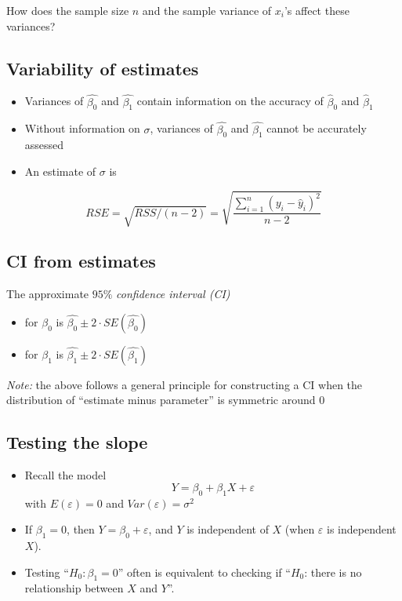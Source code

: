 \documentclass[]{article}
\providecommand{\tightlist}{%
  \setlength{\itemsep}{0pt}\setlength{\parskip}{0pt}}
\begin{document}
How does the sample size \(n\) and the sample variance of \(x_i\)'s
affect these variances?

\subsection{Variability of estimates}\label{variability-of-estimates-1}

\begin{itemize}
\item
  Variances of \(\hat{\beta_0}\) and \(\hat{\beta_1}\) contain
  information on the accuracy of \(\hat{\beta}_0\) and \(\hat{\beta}_1\)
\item
  Without information on \(\sigma\), variances of \(\hat{\beta_0}\) and
  \(\hat{\beta_1}\) cannot be accurately assessed
\item
  An estimate of \(\sigma\) is
\end{itemize}

\[RSE = \sqrt{RSS/(n-2)} = \sqrt{\frac{\sum_{i=1}^n (y_i - \hat{y}_i)^2}{n-2}}\]

\subsection{CI from estimates}\label{ci-from-estimates}

The approximate \(95\%\) \emph{confidence interval (CI)}

\begin{itemize}
\tightlist
\item
  for \(\beta_0\) is \(\hat{\beta_0} \pm 2 \cdot SE(\hat{\beta_0})\)
\item
  for \(\beta_1\) is \(\hat{\beta_1} \pm 2 \cdot SE(\hat{\beta_1})\)
\end{itemize}

\emph{Note:} the above follows a general principle for constructing a CI
when the distribution of ``estimate minus parameter'' is symmetric
around \(0\)

\subsection{Testing the slope}\label{testing-the-slope}

\begin{itemize}
\tightlist
\item
  Recall the model \[Y = \beta_0 + \beta_1 X + \varepsilon\] with
  \(E(\varepsilon)=0\) and \(Var(\varepsilon)=\sigma^2\)
\item
  If \(\beta_1=0\), then \(Y = \beta_0 + \varepsilon\), and \(Y\) is
  independent of \(X\) (when \(\varepsilon\) is independent \(X\)).
\item
  Testing ``\(H_0: \beta_1=0\)'' often is equivalent to checking if
  ``\(H_0\): there is no relationship between \(X\) and \(Y\)''.
\end{itemize}
\end{document}
